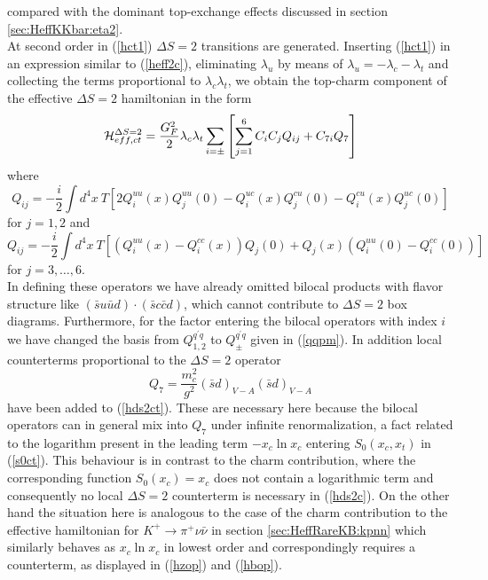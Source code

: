 compared with the dominant top-exchange effects discussed in section
\ref{sec:HeffKKbar:eta2}.
\\
At second order in (\ref{hct1}) $\Delta S=2$ transitions are generated.
Inserting (\ref{hct1}) in an expression similar to (\ref{heff2c}),
eliminating $\lambda_u$ by means of $\lambda_u=-\lambda_c-\lambda_t$
and collecting the terms proportional to $\lambda_c\lambda_t$, we
obtain the top-charm component of the effective $\Delta S=2$
hamiltonian in the form
\begin{equation}\label{hds2ct}
{\cal H}^{\Delta S=2}_{eff,ct}=\frac{G^2_F}{2}\lambda_c\lambda_t
 \sum_{i=\pm}\left[\sum_{j=1}^6 C_i C_j Q_{ij}
 +C_{7i} Q_7\right]
\end{equation}
where   
\begin{equation}\label{qij12}
Q_{ij}=-\frac{i}{2}\int d^4x\ T\left[
2Q^{uu}_i(x)Q^{uu}_j(0)-Q^{uc}_i(x)Q^{cu}_j(0)-
Q^{cu}_i(x)Q^{uc}_j(0) \right]
\end{equation}
for $j=1, 2$ and
\begin{equation}\label{qij36}
Q_{ij}=-\frac{i}{2}\int d^4x\ T\left[
\left(Q^{uu}_i(x)-Q^{cc}_i(x)\right)Q_j(0)+
Q_j(x)\left(Q^{uu}_i(0)-Q^{cc}_i(0)\right)\right]
\end{equation}
for $j=3, \ldots,6$.
\\
In defining these operators we have already omitted bilocal products
with flavor structure like $(\bar su\bar ud)\cdot(\bar sc\bar cd)$,
which cannot contribute to $\Delta S=2$ box diagrams. Furthermore,
for the factor entering the bilocal operators with index
$i$ we have changed the basis from $Q^{q^\prime q}_{1,2}$ to
$Q^{q^\prime q}_\pm$ given in (\ref{qqpm}).
In addition local counterterms proportional to the $\Delta S=2$
operator
\begin{equation}\label{q7def}
Q_7=\frac{m^2_c}{g^2}(\bar sd)_{V-A}(\bar sd)_{V-A}
\end{equation}
have been added to (\ref{hds2ct}). These are necessary here because
the bilocal operators can in general mix into $Q_7$ under infinite
renormalization, a fact related to the logarithm present in the
leading term $-x_c\ln x_c$ entering $S_0(x_c, x_t)$ in (\ref{s0ct}).
This behaviour is in contrast to the charm contribution, where the
corresponding function $S_0(x_c)=x_c$ does not contain a logarithmic term
and consequently no local $\Delta S=2$ counterterm is necessary in
(\ref{hds2c}). On the other hand the situation here is analogous to the
case of the charm contribution to the effective hamiltonian for
$K^+\to\pi^+\nu\bar\nu$ in section \ref{sec:HeffRareKB:kpnn} which
similarly behaves as $x_c\ln x_c$ in lowest order and correspondingly
requires a counterterm, as displayed in (\ref{hzop}) and (\ref{hbop}).

